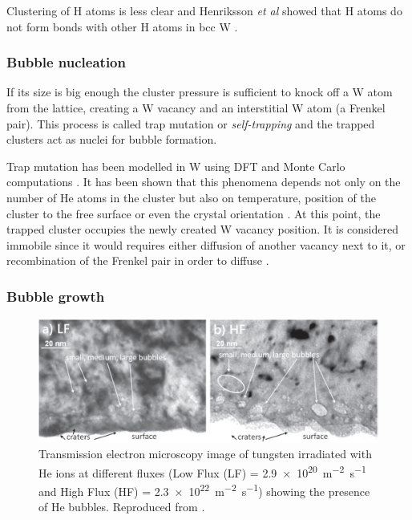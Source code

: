 Clustering of H atoms is less clear and Henriksson \textit{et al} showed that H atoms do not form bonds with other H atoms in bcc W .

\subsubsection{Bubble nucleation}

If its size is big enough the cluster pressure is sufficient to knock off a W atom from the lattice, creating a W vacancy and an interstitial W atom (a Frenkel pair).
This process is called trap mutation or \textit{self-trapping} and the trapped clusters act as nuclei for bubble formation.

Trap mutation has been modelled in W using DFT  and Monte Carlo computations .
It has been shown that this phenomena depends not only on the number of He atoms in the cluster but also on temperature, position of the cluster to the free surface or even the crystal orientation .
At this point, the trapped cluster occupies the newly created W vacancy position.
It is considered immobile since it would requires either diffusion of another vacancy next to it, or recombination of the Frenkel pair in order to diffuse .

\subsubsection{Bubble growth}

\begin{figure} [h!]
    \centering
    \includegraphics[width=\linewidth]{Figures/Chapter1/helium_bubbles_ialovega.jpg}
    \caption{Transmission electron microscopy image of tungsten irradiated with He ions at different fluxes (Low Flux (LF) = \SI{2.9e20}{m^{-2}.s^{-1}} and High Flux (HF) = \SI{2.3e22}{m^{-2}.s^{-1}}) showing the presence of He bubbles. Reproduced from \cite{ialovega_hydrogen_2020}.}
    \label{fig: he bubbles ialovega}
\end{figure}


